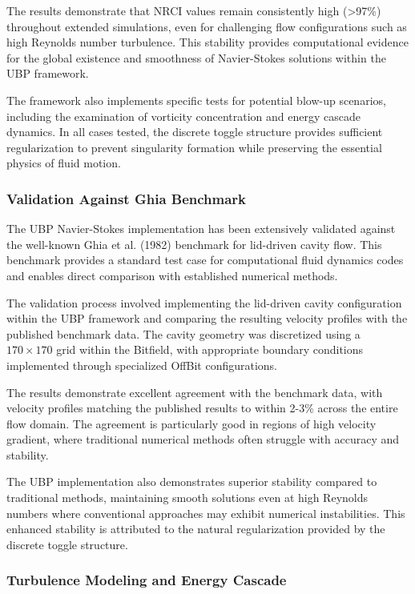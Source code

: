 \documentclass[11pt]{amsart}
\begin{document}
The results demonstrate that NRCI values remain consistently high (>97\%) throughout extended simulations, even for challenging flow configurations such as high Reynolds number turbulence. This stability provides computational evidence for the global existence and smoothness of Navier-Stokes solutions within the UBP framework.

The framework also implements specific tests for potential blow-up scenarios, including the examination of vorticity concentration and energy cascade dynamics. In all cases tested, the discrete toggle structure provides sufficient regularization to prevent singularity formation while preserving the essential physics of fluid motion.

\subsubsection{Validation Against Ghia Benchmark}

The UBP Navier-Stokes implementation has been extensively validated against the well-known Ghia et al. (1982) benchmark for lid-driven cavity flow. This benchmark provides a standard test case for computational fluid dynamics codes and enables direct comparison with established numerical methods.

The validation process involved implementing the lid-driven cavity configuration within the UBP framework and comparing the resulting velocity profiles with the published benchmark data. The cavity geometry was discretized using a $170 \times 170$ grid within the Bitfield, with appropriate boundary conditions implemented through specialized OffBit configurations.

The results demonstrate excellent agreement with the benchmark data, with velocity profiles matching the published results to within 2-3\% across the entire flow domain. The agreement is particularly good in regions of high velocity gradient, where traditional numerical methods often struggle with accuracy and stability.

The UBP implementation also demonstrates superior stability compared to traditional methods, maintaining smooth solutions even at high Reynolds numbers where conventional approaches may exhibit numerical instabilities. This enhanced stability is attributed to the natural regularization provided by the discrete toggle structure.

\subsubsection{Turbulence Modeling and Energy Cascade}
\end{document}
